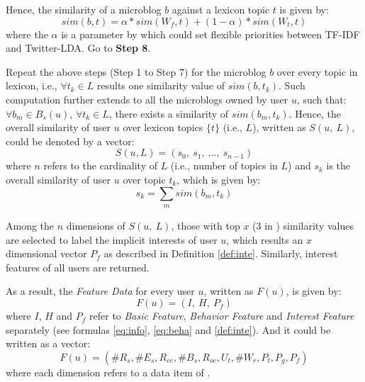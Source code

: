 \begin{comment}
:
\begin{equation}
\label{eq:sim-tw2}
sim(w'_i, t) = \sum_{\substack{j}} sim(w'_i, c_j)
\end{equation}
\end{comment}



 Hence, the similarity of a microblog $b$ against a lexicon topic $t$ is given by:
\begin{equation}
\label{eq:simbt}
sim(b, t) = \alpha * sim(W_f, t) + (1 - \alpha) * sim(W_t, t)
\end{equation}
where the $\alpha$ is a parameter by which \sys{} could set flexible priorities between TF-IDF and Twitter-LDA.
Go to \textbf{Step 8}.

 Repeat the above steps (Step 1 to Step 7) for the microblog $b$ over every topic in lexicon, i.e., $\forall t_k \in L$ results one similarity value of $sim(b, t_k)$.
Such computation further extends to all the microblogs owned by user $u$, such that:
$\forall b_m \in B_s(u)$, $\forall t_k \in L$, there exists a similarity of $sim(b_m, t_k)$.
Hence, the overall similarity of user $u$ over lexicon topics $\{t\}$ (i.e., $L$), written as $S(u,\ L)$, could be denoted by a vector:
\begin{equation}
\label{eq:simul}
S(u, L) = (s_0,\ s_1,\ ...,\ s_{n-1})
\end{equation}
where $n$ refers to the cardinality of $L$ (i.e., number of topics in $L$) and $s_k$ is the overall similarity of user $u$ over topic $t_k$, which is given by:
\begin{equation}
\label{eq:simul-2}
s_k = \sum_{\substack{m}} sim(b_m, t_k)
\end{equation}

Among the $n$ dimensions of $S(u,\ L)$, those with top $x$ (3 in \sys{}) similarity values are selected to label the implicit interests of user $u$, which results an $x$ dimensional vector $P_f$ as described in Definition \ref{def:inte}.
Similarly, interest features of all users are returned.

As a result, the \textit{Feature Data} for every user $u$, written as $F(u)$, is given by:
\begin{equation}
\label{eq:fu}
	F(u) = (I,\ H,\ P_f)
\end{equation}
where $I$, $H$ and $P_f$ refer to \textit{Basic Feature}, \textit{Behavior Feature} and \textit{Interest Feature} separately (see formulas \ref{eq:info}, \ref{eq:beha} and \ref{def:inte}).
And it could be written as a vector:
\begin{equation}
\label{eq:fu-flat}
	F(u) = (\#R_s, \#E_s, R_{ee}, \#B_s, R_{oc}, U_t, \#W_r, P_t, P_g, P_f)
\end{equation}
where each dimension refers to a data item of \sys{}.

